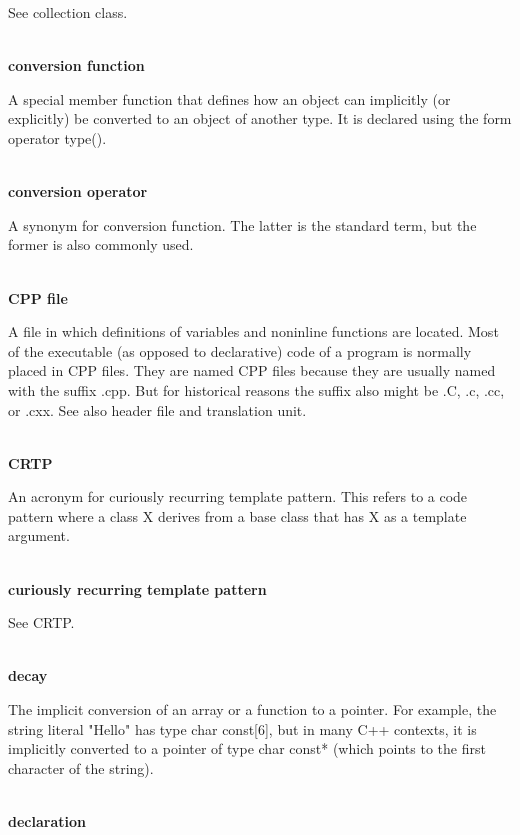 See collection class.

\hspace*{\fill} \\ %
\noindent
\textbf{conversion function}

A special member function that defines how an object can implicitly (or explicitly) be converted to an object of another type. It is declared using the form operator type().

\hspace*{\fill} \\ %
\noindent
\textbf{conversion operator}

A synonym for conversion function. The latter is the standard term, but the former is also commonly
used.

\hspace*{\fill} \\ %
\noindent
\textbf{CPP file}

A file in which definitions of variables and noninline functions are located. Most of the executable  (as opposed to declarative) code of a program is normally placed in CPP files. They are named CPP files because they are usually named with the suffix .cpp. But for historical reasons the suffix also might be .C, .c, .cc, or .cxx. See also header file and translation unit.

\hspace*{\fill} \\ %
\noindent
\textbf{CRTP}

An acronym for curiously recurring template pattern. This refers to a code pattern where a class X derives from a base class that has X as a template argument.

\hspace*{\fill} \\ %
\noindent
\textbf{curiously recurring template pattern}

See CRTP.

\hspace*{\fill} \\ %
\noindent
\textbf{decay}

The implicit conversion of an array or a function to a pointer. For example, the string literal "Hello" has type char const[6], but in many C++ contexts, it is implicitly converted to a pointer of type char const* (which points to the first character of the string).

\hspace*{\fill} \\ %
\noindent
\textbf{declaration}


